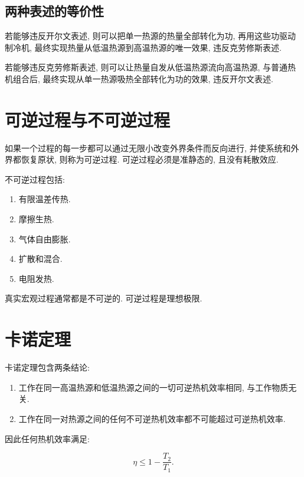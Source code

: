 \documentclass[
  a4paper,
]{ctexrep}
\providecommand{\tightlist}{%
  \setlength{\itemsep}{0pt}\setlength{\parskip}{0pt}}
\begin{document}
\subsection{两种表述的等价性}\label{ux4e24ux79cdux8868ux8ff0ux7684ux7b49ux4ef7ux6027}

若能够违反开尔文表述, 则可以把单一热源的热量全部转化为功,
再用这些功驱动制冷机, 最终实现热量从低温热源到高温热源的唯一效果,
违反克劳修斯表述.

若能够违反克劳修斯表述, 则可以让热量自发从低温热源流向高温热源,
与普通热机组合后, 最终实现从单一热源吸热全部转化为功的效果,
违反开尔文表述.

\section{可逆过程与不可逆过程}\label{ux53efux9006ux8fc7ux7a0bux4e0eux4e0dux53efux9006ux8fc7ux7a0b}

如果一个过程的每一步都可以通过无限小改变外界条件而反向进行,
并使系统和外界都恢复原状, 则称为可逆过程. 可逆过程必须是准静态的,
且没有耗散效应.

不可逆过程包括:

\begin{enumerate}
\def\labelenumi{\arabic{enumi}.}
\tightlist
\item
  有限温差传热.
\item
  摩擦生热.
\item
  气体自由膨胀.
\item
  扩散和混合.
\item
  电阻发热.
\end{enumerate}

真实宏观过程通常都是不可逆的. 可逆过程是理想极限.

\section{卡诺定理}\label{ux5361ux8bfaux5b9aux7406}

卡诺定理包含两条结论:

\begin{enumerate}
\def\labelenumi{\arabic{enumi}.}
\tightlist
\item
  工作在同一高温热源和低温热源之间的一切可逆热机效率相同,
  与工作物质无关.
\item
  工作在同一对热源之间的任何不可逆热机效率都不可能超过可逆热机效率.
\end{enumerate}

因此任何热机效率满足:

\[
\eta\leq 1-\frac{T_2}{T_1}.
\]
\end{document}
